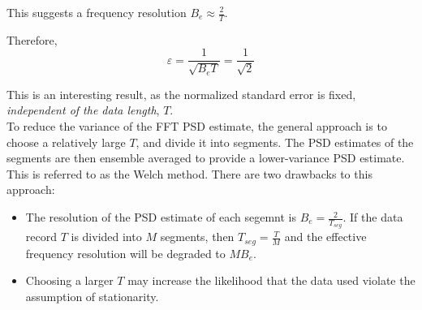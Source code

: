 \documentclass[12pt]{book}
\theoremstyle{definition}
\begin{document}
This suggests a frequency resolution \(B_e \approx \frac{2}{T}\). 

Therefore,
\[
\varepsilon  = \frac{1}{\sqrt{B_e T}} = \frac{1}{\sqrt{2}}
\]

This is an interesting result, as the normalized standard error is fixed, \emph{independent of the data length}, \(T\). \\

To reduce the variance of the FFT PSD estimate, the general approach is to choose a relatively large \(T\), and divide it into segments. The PSD estimates of the segments are then ensemble averaged to provide a lower-variance PSD estimate. This is referred to as the Welch method. There are two drawbacks to this approach:
\begin{itemize}
    \item The resolution of the PSD estimate of each segemnt is \(B_e = \frac{2}{T_{seg}}\). If the data record \(T\) is divided into \(M\) segments, then \(T_{seg} = \frac{T}{M} \) and the effective frequency resolution will be degraded to \(M B_e\).
    \item Choosing a larger \(T\) may increase the likelihood that the data used violate the assumption of stationarity.
\end{itemize}
\end{document}
